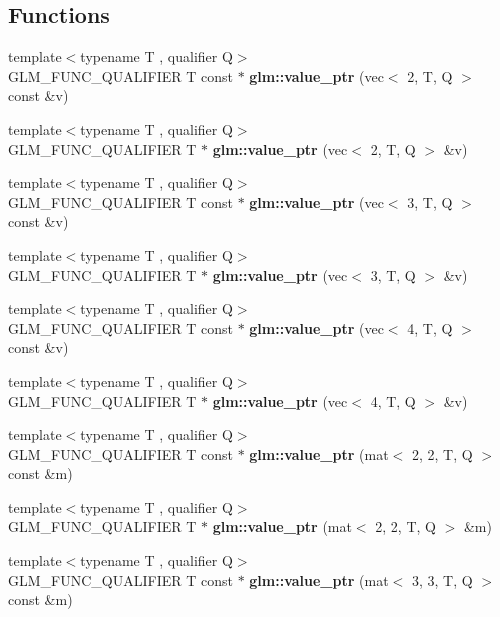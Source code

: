 \subsection*{Functions}
\begin{DoxyCompactItemize}
\item 
{\footnotesize template$<$typename T , qualifier Q$>$ }\\G\+L\+M\+\_\+\+F\+U\+N\+C\+\_\+\+Q\+U\+A\+L\+I\+F\+I\+ER T const  $\ast$ {\bfseries glm\+::value\+\_\+ptr} (vec$<$ 2, T, Q $>$ const \&v)
\item 
{\footnotesize template$<$typename T , qualifier Q$>$ }\\G\+L\+M\+\_\+\+F\+U\+N\+C\+\_\+\+Q\+U\+A\+L\+I\+F\+I\+ER T $\ast$ {\bfseries glm\+::value\+\_\+ptr} (vec$<$ 2, T, Q $>$ \&v)
\item 
{\footnotesize template$<$typename T , qualifier Q$>$ }\\G\+L\+M\+\_\+\+F\+U\+N\+C\+\_\+\+Q\+U\+A\+L\+I\+F\+I\+ER T const  $\ast$ {\bfseries glm\+::value\+\_\+ptr} (vec$<$ 3, T, Q $>$ const \&v)
\item 
{\footnotesize template$<$typename T , qualifier Q$>$ }\\G\+L\+M\+\_\+\+F\+U\+N\+C\+\_\+\+Q\+U\+A\+L\+I\+F\+I\+ER T $\ast$ {\bfseries glm\+::value\+\_\+ptr} (vec$<$ 3, T, Q $>$ \&v)
\item 
{\footnotesize template$<$typename T , qualifier Q$>$ }\\G\+L\+M\+\_\+\+F\+U\+N\+C\+\_\+\+Q\+U\+A\+L\+I\+F\+I\+ER T const  $\ast$ {\bfseries glm\+::value\+\_\+ptr} (vec$<$ 4, T, Q $>$ const \&v)
\item 
{\footnotesize template$<$typename T , qualifier Q$>$ }\\G\+L\+M\+\_\+\+F\+U\+N\+C\+\_\+\+Q\+U\+A\+L\+I\+F\+I\+ER T $\ast$ {\bfseries glm\+::value\+\_\+ptr} (vec$<$ 4, T, Q $>$ \&v)
\item 
{\footnotesize template$<$typename T , qualifier Q$>$ }\\G\+L\+M\+\_\+\+F\+U\+N\+C\+\_\+\+Q\+U\+A\+L\+I\+F\+I\+ER T const  $\ast$ {\bfseries glm\+::value\+\_\+ptr} (mat$<$ 2, 2, T, Q $>$ const \&m)
\item 
{\footnotesize template$<$typename T , qualifier Q$>$ }\\G\+L\+M\+\_\+\+F\+U\+N\+C\+\_\+\+Q\+U\+A\+L\+I\+F\+I\+ER T $\ast$ {\bfseries glm\+::value\+\_\+ptr} (mat$<$ 2, 2, T, Q $>$ \&m)
\item 
{\footnotesize template$<$typename T , qualifier Q$>$ }\\G\+L\+M\+\_\+\+F\+U\+N\+C\+\_\+\+Q\+U\+A\+L\+I\+F\+I\+ER T const  $\ast$ {\bfseries glm\+::value\+\_\+ptr} (mat$<$ 3, 3, T, Q $>$ const \&m)

\end{DoxyCompactItemize}

